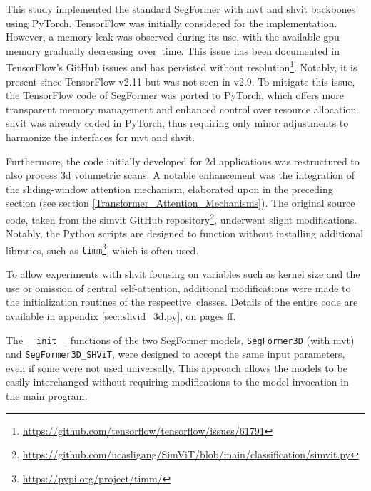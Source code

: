 \bigskip

This study implemented the standard SegFormer with \gls{mvt} and \gls{shvit} backbones using PyTorch. TensorFlow was initially considered for the implementation. However, a memory leak was observed during its use, with the available \gls{gpu} memory gradually decreasing over time. This issue has been documented in TensorFlow's GitHub issues and has persisted without resolution\footnote{\url{https://github.com/tensorflow/tensorflow/issues/61791}}. Notably, it is present since TensorFlow v2.11 but was not seen in v2.9. To mitigate this issue, the TensorFlow code of SegFormer was ported to PyTorch, which offers more transparent memory management and enhanced control over resource allocation.
\gls{shvit} was already coded in PyTorch, thus requiring only minor adjustments to harmonize the interfaces for \gls{mvt} and \gls{shvit}.

\medskip

Furthermore, the code initially developed for \gls{2d} applications was restructured to also process \gls{3d} volumetric scans. A notable enhancement was the integration of the sliding-window attention mechanism, elaborated upon in the preceding section (see section \ref{Transformer_Attention_Mechanisms}). The original source code, taken from the \gls{simvit} GitHub repository\footnote{\url{https://github.com/ucasligang/SimViT/blob/main/classification/simvit.py}}, underwent slight modifications. Notably, the Python scripts are designed to function without installing additional libraries, such as {\tt timm}\footnote{\url{https://pypi.org/project/timm/}}, which is often used.

\medskip

To allow experiments with \gls{shvit} focusing on variables such as kernel size and the use or omission of central self-attention, additional modifications were made to the initialization routines of the respective classes. Details of the entire code are available in appendix \ref{sec::shvid_3d.py}, on pages \pageref{sec::shvid_3d.py}ff.

\medskip

The {\tt \_\_init\_\_} functions of the two SegFormer models, {\tt SegFormer3D} (with \gls{mvt}) and {\tt SegFormer3D\_SHViT}, were designed to accept the same input parameters, even if some were not used universally. This approach allows the models to be easily interchanged without requiring modifications to the model invocation in the main program.

\medskip

